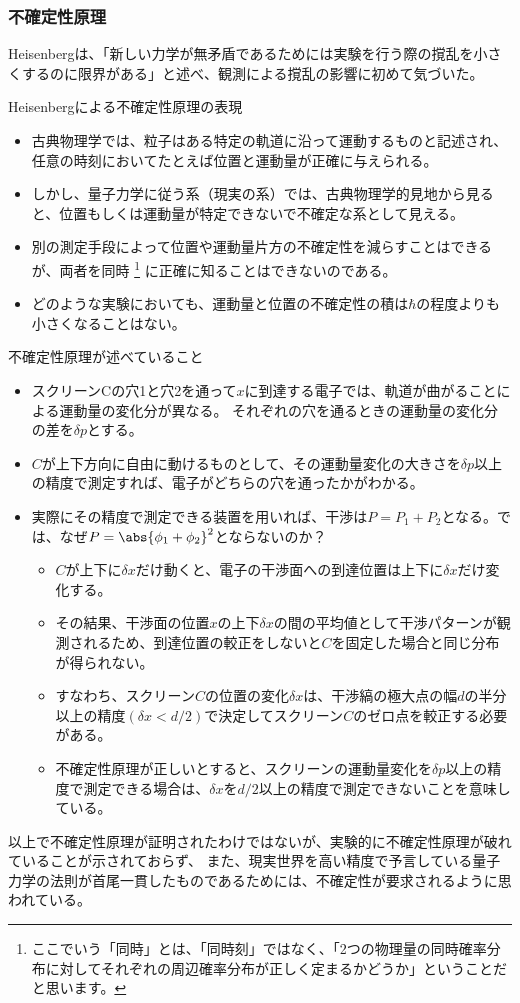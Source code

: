 \documentclass[11pt,aspectratio=169,xcolor=dvipsnames,table,dvipdfmx]{beamer}
\begin{document}
\begin{frame}
  \frametitle{不確定性原理}
  Heisenbergは、「新しい力学が無矛盾であるためには実験を行う際の撹乱を小さくするのに限界がある」と述べ、観測による撹乱の影響に初めて気づいた。
  \begin{block}{Heisenbergによる不確定性原理の表現}
    \begin{itemize}
      \item 古典物理学では、粒子はある特定の軌道に沿って運動するものと記述され、任意の時刻においてたとえば位置と運動量が正確に与えられる。
      \item しかし、量子力学に従う系（現実の系）では、古典物理学的見地から見ると、位置もしくは運動量が特定できないで不確定な系として見える。
      \item 別の測定手段によって位置や運動量片方の不確定性を減らすことはできるが、両者を同時
      \footnote{ここでいう「同時」とは、「同時刻」ではなく、「2つの物理量の同時確率分布に対してそれぞれの周辺確率分布が正しく定まるかどうか」ということだと思います。}
      に正確に知ることはできないのである。
      \item どのような実験においても、運動量と位置の不確定性の積は$\hbar$の程度よりも小さくなることはない。
    \end{itemize}
  \end{block}
\end{frame}
\begin{frame}{不確定性原理が述べていること}
    \begin{itemize}
      \item スクリーンCの穴1と穴2を通って$x$に到達する電子では、軌道が曲がることによる運動量の変化分が異なる。
      それぞれの穴を通るときの運動量の変化分の差を$\delta p$とする。
      \item $C$が上下方向に自由に動けるものとして、その運動量変化の大きさを$\delta p$以上の精度で測定すれば、電子がどちらの穴を通ったかがわかる。
      \item 実際にその精度で測定できる装置を用いれば、干渉は$P=P_1+P_2$となる。では、なぜ$P=\abs{\phi_1+\phi_2}^2$とならないのか？
      \begin{itemize}
      \item $C$が上下に$\delta x$だけ動くと、電子の干渉面への到達位置は上下に$\delta x$だけ変化する。
      \item その結果、干渉面の位置$x$の上下$\delta x$の間の平均値として干渉パターンが観測されるため、到達位置の較正をしないと$C$を固定した場合と同じ分布が得られない。
      \item すなわち、スクリーン$C$の位置の変化$\delta x$は、干渉縞の極大点の幅$d$の半分以上の精度$(\delta x <d/2)$で決定してスクリーン$C$のゼロ点を較正する必要がある。
      \item 不確定性原理が正しいとすると、スクリーンの運動量変化を$\delta p$以上の精度で測定できる場合は、$\delta x$を$d/2$以上の精度で測定できないことを意味している。
      \end{itemize}
    \end{itemize}
  以上で不確定性原理が証明されたわけではないが、実験的に不確定性原理が破れていることが示されておらず、
  また、現実世界を高い精度で予言している量子力学の法則が首尾一貫したものであるためには、不確定性が要求されるように思われている。
\end{frame}
\end{document}
